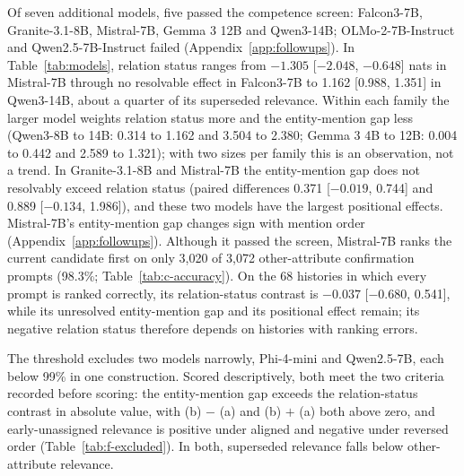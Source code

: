 Of seven additional models, five passed the competence screen: Falcon3-7B, Granite-3.1-8B, Mistral-7B, Gemma 3 12B and Qwen3-14B; OLMo-2-7B-Instruct and Qwen2.5-7B-Instruct failed (Appendix~\ref{app:followups}). In Table~\ref{tab:models}, relation status ranges from $-1.305$ [$-2.048$, $-0.648$] nats in Mistral-7B through no resolvable effect in Falcon3-7B to 1.162 [0.988, 1.351] in Qwen3-14B, about a quarter of its superseded relevance. Within each family the larger model weights relation status more and the entity-mention gap less (Qwen3-8B to 14B: 0.314 to 1.162 and 3.504 to 2.380; Gemma 3 4B to 12B: 0.004 to 0.442 and 2.589 to 1.321); with two sizes per family this is an observation, not a trend. In Granite-3.1-8B and Mistral-7B the entity-mention gap does not resolvably exceed relation status (paired differences 0.371 [$-0.019$, 0.744] and 0.889 [$-0.134$, 1.986]), and these two models have the largest positional effects. Mistral-7B's entity-mention gap changes sign with mention order (Appendix~\ref{app:followups}). Although it passed the screen, Mistral-7B ranks the current candidate first on only 3,020 of 3,072 other-attribute confirmation prompts (98.3\%; Table~\ref{tab:c-accuracy}). On the 68 histories in which every prompt is ranked correctly, its relation-status contrast is $-0.037$ [$-0.680$, 0.541], while its unresolved entity-mention gap and its positional effect remain; its negative relation status therefore depends on histories with ranking errors.

The threshold excludes two models narrowly, Phi-4-mini and Qwen2.5-7B, each below 99\% in one construction. Scored descriptively, both meet the two criteria recorded before scoring: the entity-mention gap exceeds the relation-status contrast in absolute value, with (b) $-$ (a) and (b) $+$ (a) both above zero, and early-unassigned relevance is positive under aligned and negative under reversed order (Table~\ref{tab:f-excluded}). In both, superseded relevance falls below other-attribute relevance.
